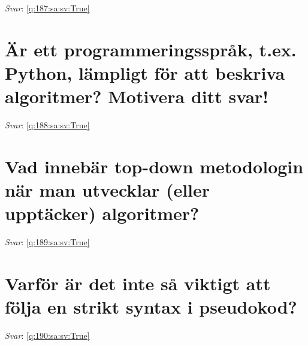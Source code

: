 \documentclass[a4paper,11pt,oneside]{book}
\begin{document}
\begin{sloppypar}
\vspace{2cm}

\noindent\makebox[\textwidth]{\hrulefill}

\vspace{1cm}

\textit{Svar}: \autoref{q:187:sa:sv:True}



\section{\"Ar ett programmeringsspr\r{a}k, t.ex. Python, l\"ampligt f\"or att beskriva algoritmer? Motivera ditt svar!}

\label{q:188:sa:sv:False}

\vspace{2cm}

\noindent\makebox[\textwidth]{\hrulefill}

\vspace{1cm}

\textit{Svar}: \autoref{q:188:sa:sv:True}



\section{Vad inneb\"ar top-down metodologin n\"ar man utvecklar (eller uppt\"acker) algoritmer?}

\label{q:189:sa:sv:False}

\vspace{2cm}

\noindent\makebox[\textwidth]{\hrulefill}

\vspace{1cm}

\textit{Svar}: \autoref{q:189:sa:sv:True}



\section{Varf\"or \"ar det inte s\r{a} viktigt att f\"olja en strikt syntax i pseudokod?}

\label{q:190:sa:sv:False}

\vspace{2cm}

\noindent\makebox[\textwidth]{\hrulefill}

\vspace{1cm}

\textit{Svar}: \autoref{q:190:sa:sv:True}




\end{sloppypar}
\end{document}
